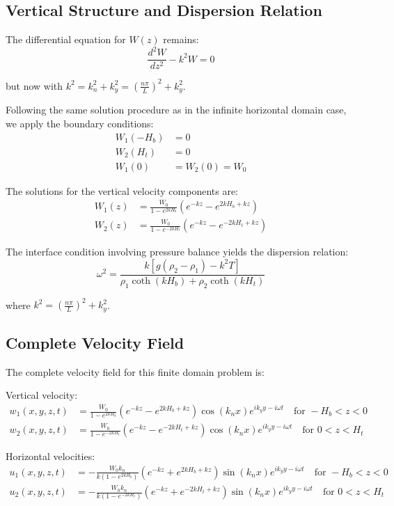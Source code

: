\documentclass[12pt,a4paper]{article}
\begin{document}
\subsection{Vertical Structure and Dispersion Relation}
The differential equation for $W(z)$ remains:
\begin{equation}
\frac{d^2W}{dz^2} - k^2W = 0
\end{equation}

but now with $k^2 = k_n^2 + k_y^2 = \left(\frac{n\pi}{L}\right)^2 + k_y^2$.

Following the same solution procedure as in the infinite horizontal domain case, we apply the boundary conditions:
\begin{align}
W_1(-H_b) &= 0 \\
W_2(H_t) &= 0 \\
W_1(0) &= W_2(0) = W_0
\end{align}

The solutions for the vertical velocity components are:
\begin{align}
W_1(z) &= \frac{W_0}{1 - e^{2kH_b}}(e^{-kz} - e^{2kH_b+kz}) \\
W_2(z) &= \frac{W_0}{1 - e^{-2kH_t}}(e^{-kz} - e^{-2kH_t+kz})
\end{align}

The interface condition involving pressure balance yields the dispersion relation:
\begin{equation}
\omega^2 = \frac{k[g(\rho_2 - \rho_1) - k^2T]}{\rho_1\coth(kH_b) + \rho_2\coth(kH_t)}
\end{equation}

where $k^2 = \left(\frac{n\pi}{L}\right)^2 + k_y^2$.

\subsection{Complete Velocity Field}
The complete velocity field for this finite domain problem is:

Vertical velocity:
\begin{align}
w_1(x,y,z,t) &= \frac{W_0}{1-e^{2kH_b}}(e^{-kz}-e^{2kH_b+kz})\cos(k_n x)e^{ik_y y-i\omega t} \quad \text{for } -H_b < z < 0 \\
w_2(x,y,z,t) &= \frac{W_0}{1-e^{-2kH_t}}(e^{-kz}-e^{-2kH_t+kz})\cos(k_n x)e^{ik_y y-i\omega t} \quad \text{for } 0 < z < H_t
\end{align}

Horizontal velocities:
\begin{align}
u_1(x,y,z,t) &= -\frac{W_0 k_n}{k(1-e^{2kH_b})}(e^{-kz}+e^{2kH_b+kz})\sin(k_n x)e^{ik_y y-i\omega t} \quad \text{for } -H_b < z < 0 \\
u_2(x,y,z,t) &= -\frac{W_0 k_n}{k(1-e^{-2kH_t})}(e^{-kz}+e^{-2kH_t+kz})\sin(k_n x)e^{ik_y y-i\omega t} \quad \text{for } 0 < z < H_t
\end{align}
\end{document}
